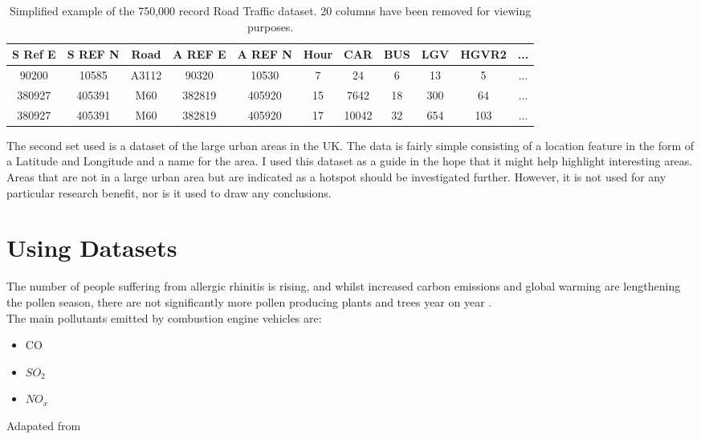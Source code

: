 \begin{table}[H]
\begin{center}
\begin{tabular}{|c|c|c|c|c|c|c|c|c|c|c|}\hline\hline
S Ref E&S REF N&Road&A REF E&A REF N&Hour&CAR&BUS&LGV&HGVR2&...\\\hline
90200&10585&A3112&90320&10530&7&24&6&13&5&...\\
380927&405391&M60&382819&405920&15&7642&18&300&64&...\\
380927&405391&M60&382819&405920&17&10042&32&654&103&...\\\hline\hline
\end{tabular}
\caption{Simplified example of the 750,000 record Road Traffic dataset. 20 columns have been removed for viewing purposes.}\label{RoadTrafficData}
\end{center}
\end{table}

The second set used is a dataset of the large urban areas in the UK. The data is fairly simple consisting of a location feature in the form of a Latitude and Longitude and a name for the area. I used this dataset as a guide in the hope that it might help highlight interesting areas. Areas that are not in a large urban area but are indicated as a hotspot should be investigated further. However, it is not used for any particular research benefit, nor is it used to draw any conclusions.\\

\section{Using Datasets}

The number of people suffering from allergic rhinitis is rising, and whilst increased carbon emissions and global warming are lengthening the pollen season, there are not significantly more pollen producing plants and trees year on year \cite{co2pollen, allergyrising}.\\

The main pollutants emitted by combustion engine vehicles are:

\begin{itemize}
    \item CO
    \item $SO_2$
    \item $NO_x$
\end{itemize}

\begin{center}
Adapated from \cite{vehcemis}
\end{center}

